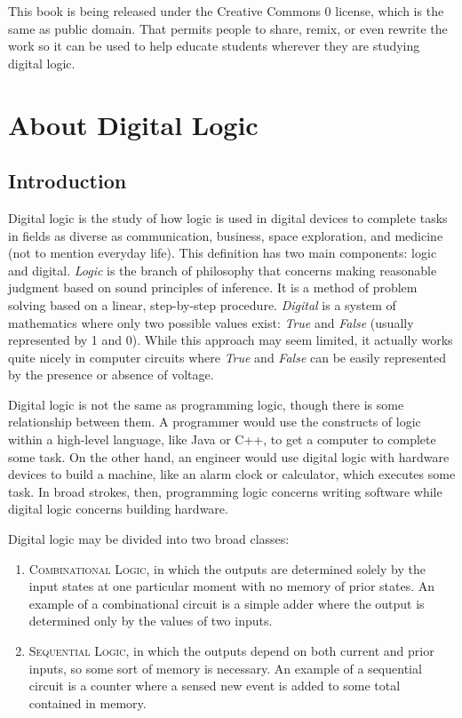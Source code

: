 This book is being released under the Creative Commons 0 license, which is the same as public domain. That permits people to share, remix, or even rewrite the work so it can be used to help educate students wherever they are studying digital logic. 


\section{About Digital Logic}

\subsection{Introduction}

Digital logic is the study of how logic is used in digital devices to complete tasks in fields as diverse as communication, business, space exploration, and medicine (not to mention everyday life). This definition has two main components: logic and digital. \emph{Logic} is the branch of philosophy that concerns making reasonable judgment based on sound principles of inference. It is a method of problem solving based on a linear, step-by-step procedure. \emph{Digital} is a system of mathematics where only two possible values exist: \emph{True} and \emph{False} (usually represented by 1 and 0). While this approach may seem limited, it actually works quite nicely in computer circuits where \emph{True} and \emph{False} can be easily represented by the presence or absence of voltage.

Digital logic is not the same as programming logic, though there is some relationship between them. A programmer would use the constructs of logic within a high-level language, like Java or C++, to get a computer to complete some task. On the other hand, an engineer would use digital logic with hardware devices to build a machine, like an alarm clock or calculator, which executes some task. In broad strokes, then, programming logic concerns writing software while digital logic concerns building hardware. 

Digital logic may be divided into two broad classes: 

\begin{enumerate}

  \item \textsc{Combinational Logic}, in which the outputs are determined solely by the input states at one particular moment with no memory of prior states. An example of a combinational circuit is a simple adder where the output is determined only by the values of two inputs.

  \item \textsc{Sequential Logic}, in which the outputs depend on both current and prior inputs, so some sort of memory is necessary. An example of a sequential circuit is a counter where a sensed new event is added to some total contained in memory.

\end{enumerate}

